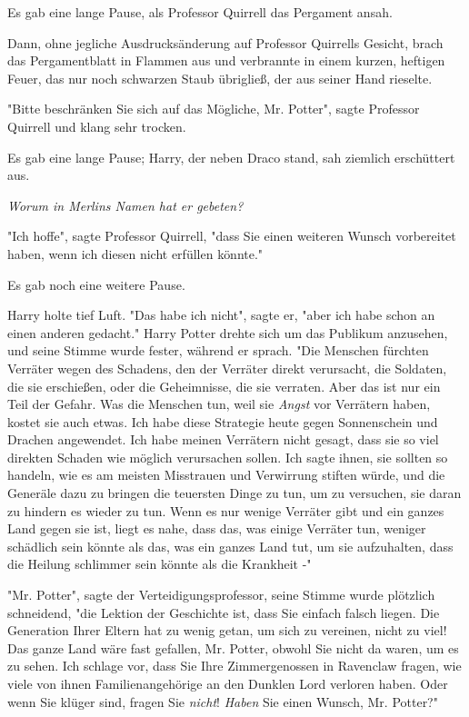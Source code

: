 {Es gab eine lange Pause, als Professor Quirrell das Pergament ansah.

Dann, ohne jegliche Ausdrucksänderung auf Professor Quirrells Gesicht, brach das Pergamentblatt in Flammen aus und verbrannte in einem kurzen, heftigen Feuer, das nur noch schwarzen Staub übrigließ, der aus seiner Hand rieselte.

"Bitte beschränken Sie sich auf das Mögliche, Mr. Potter", sagte Professor Quirrell und klang sehr trocken.

Es gab eine lange Pause; Harry, der neben Draco stand, sah ziemlich erschüttert aus.

\emph{Worum in Merlins Namen hat er gebeten?}

"Ich hoffe", sagte Professor Quirrell, "dass Sie einen weiteren Wunsch vorbereitet haben, wenn ich diesen nicht erfüllen könnte."

Es gab noch eine weitere Pause.

Harry holte tief Luft. "Das habe ich nicht", sagte er, "aber ich habe schon an einen anderen gedacht." Harry Potter drehte sich um das Publikum anzusehen, und seine Stimme wurde fester, während er sprach. "Die Menschen fürchten Verräter wegen des Schadens, den der Verräter direkt verursacht, die Soldaten, die sie erschießen, oder die Geheimnisse, die sie verraten. Aber das ist nur ein Teil der Gefahr. Was die Menschen tun, weil sie \emph{Angst} vor Verrätern haben, kostet sie auch etwas. Ich habe diese Strategie heute gegen Sonnenschein und Drachen angewendet. Ich habe meinen Verrätern nicht gesagt, dass sie so viel direkten Schaden wie möglich verursachen sollen. Ich sagte ihnen, sie sollten so handeln, wie es am meisten Misstrauen und Verwirrung stiften würde, und die Generäle dazu zu bringen die teuersten Dinge zu tun, um zu versuchen, sie daran zu hindern es wieder zu tun. Wenn es nur wenige Verräter gibt und ein ganzes Land gegen sie ist, liegt es nahe, dass das, was einige Verräter tun, weniger schädlich sein könnte als das, was ein ganzes Land tut, um sie aufzuhalten, dass die Heilung schlimmer sein könnte als die Krankheit -"

"Mr. Potter", sagte der Verteidigungsprofessor, seine Stimme wurde plötzlich schneidend, "die Lektion der Geschichte ist, dass Sie einfach falsch liegen. Die Generation Ihrer Eltern hat zu wenig getan, um sich zu vereinen, nicht zu viel! Das ganze Land wäre fast gefallen, Mr. Potter, obwohl Sie nicht da waren, um es zu sehen. Ich schlage vor, dass Sie Ihre Zimmergenossen in Ravenclaw fragen, wie viele von ihnen Familienangehörige an den Dunklen Lord verloren haben. Oder wenn Sie klüger sind, fragen Sie \emph{nicht}! \emph{Haben} Sie einen Wunsch, Mr. Potter?"

}
